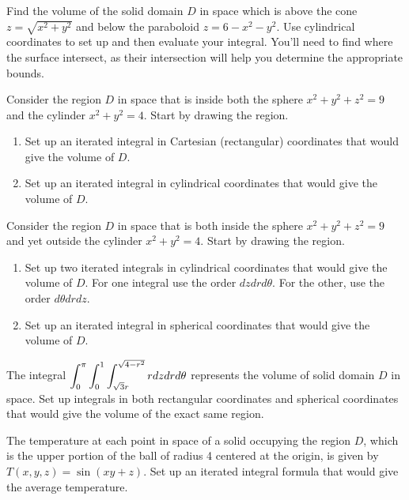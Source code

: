 \begin{problem}
Find the volume of the solid domain $D$ in space which is above the cone $z=\sqrt{x^2+y^2}$ and below the paraboloid $z=6-x^2-y^2$. Use cylindrical coordinates to set up and then evaluate your integral.  You'll need to find where the surface intersect, as their intersection will help you determine the appropriate bounds.
\end{problem}

\begin{problem}
Consider the region $D$ in space that is inside both the sphere $x^2+y^2+z^2=9$ and the cylinder $x^2+y^2=4$. Start by drawing the region.
\begin{enumerate}
 \item Set up an iterated integral in Cartesian (rectangular) coordinates that would give the volume of $D$. 
 \item Set up an iterated integral in cylindrical coordinates that would give the volume of $D$. 
\end{enumerate}
\end{problem}

\begin{problem}
Consider the region $D$ in space that is both inside the sphere $x^2+y^2+z^2=9$ and yet outside the cylinder $x^2+y^2=4$. Start by drawing the region.
\begin{enumerate}
 \item Set up two iterated integrals in cylindrical coordinates that would give the volume of $D$. For one integral use the order $dzdrd\theta$.  For the other, use the order $d\theta dr dz$.
 \item Set up an iterated integral in spherical coordinates that would give the volume of $D$. 
\end{enumerate}
\end{problem}



\begin{problem}
The integral $\displaystyle\int_{0}^{\pi}\int_{0}^{1}\int_{\sqrt{3}r}^{\sqrt{4-r^2}}rdzdrd\theta$ represents the volume of solid domain $D$ in space. Set up integrals in both rectangular coordinates and spherical coordinates that would give the volume of the exact same region.
\end{problem}

\begin{problem}
The temperature at each point in space of a solid occupying the region {$D$}, which is the upper portion of the ball of radius 4 centered at the origin, is given by $T(x,y,z) = \sin(xy+z)$.  Set up an iterated integral formula that would give the average temperature.   
\end{problem}













